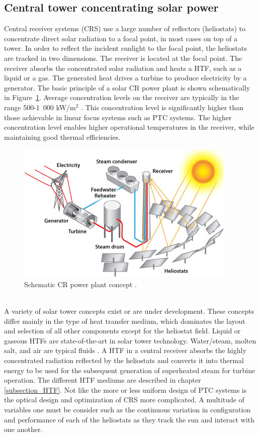 \documentclass[Master,MEE,english]{twbook}%
\begin{document}
\subsection{Central tower concentrating solar power} \label{subsection_CRS}
Central receiver systems (CRS) use a large number of reflectors (heliostats) to concentrate direct solar radiation to a focal point, in most cases on top of a tower. In order to reflect the incident sunlight to the focal point, the heliostats are tracked in two dimensions. The receiver is located at the focal point. The receiver absorbs the concentrated solar radiation and heats a HTF, such as a liquid or a gas. The generated heat drives a turbine to produce electricity by a generator. The basic principle of a solar CR power plant is shown schematically in Figure~\ref{power_tower}. Average concentration levels on the receiver are typically in the range 500-1~000 kW/m$^2$ \cite{Pitz-Paal.2013}. This concentration level is significantly higher than those achievable in linear focus systems such as PTC systems. The higher concentration level enables higher operational temperatures in the receiver, while maintaining good thermal efficiencies.
\begin{figure}[!h] 
\centering
\includegraphics[width=0.6\linewidth]{FIG/power_tower}
\caption[Schematic CR power plant concept.]{Schematic CR power plant concept \cite{U.S.DOE2013}.}\label{power_tower}
\end{figure}
\\
A variety of solar tower concepts exist or are under development. These concepts differ mainly in the type of heat transfer medium, which dominates the layout and selection of all other components except for the heliostat field. Liquid or gaseous HTFs are state-of-the-art in solar tower technology. Water/steam, molten salt, and air are typical fluids \cite{Pitz-Paal.2013}. A HTF in a central receiver absorbs the highly concentrated radiation reflected by the heliostats and converts it into thermal energy to be used for the subsequent generation of superheated steam for turbine operation. The different HTF mediums are described in  chapter \ref{subsection_HTF}. Not like the more or less uniform design of PTC systems is the optical design and optimization of CRS more complicated. A multitude of variables one must be consider such as the continuous variation in configuration and performance of each of the heliostats as they track the sun and interact with one another. \\
\end{document}
